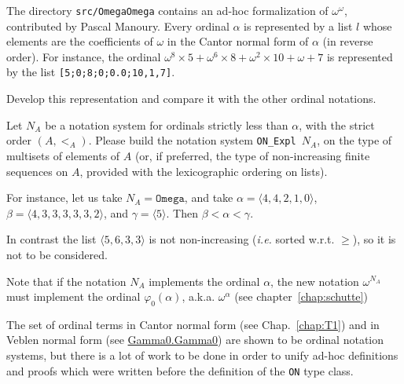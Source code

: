 
\begin{project}
The directory \texttt{src/OmegaOmega} contains an ad-hoc formalization of $\omega^\omega$, contributed by Pascal Manoury. Every ordinal $\alpha$ is represented by a list $l$ whose elements are the coefficients of $\omega$ in  the Cantor normal form of $\alpha$ (in reverse order). For instance, the ordinal 
$\omega^{8}\times 5 + \omega^{6}\times 8 + \omega^2\times 10 + \omega + 7$ is represented by the list \texttt{[5;0;8;0;0.0;10,1,7]}. 


 Develop this representation and compare it with the other ordinal notations.



\end{project}


\begin{project}
Let $N_A$ be a notation system for ordinals strictly less than $\alpha$, 
with the strict order $(A,<_A)$. Please build the notation system
\texttt{ON\_Expl $N_A$}, on the type of multisets of elements of $A$
(or, if preferred, the type of non-increasing finite sequences on $A$,
provided with the lexicographic ordering on lists).

For instance, let us take $N_A=\texttt{Omega}$, and take $\alpha=\langle 4,4,2,1,0\rangle$,
 $\beta=\langle 4,3,3,3,3,3,2\rangle$, and $\gamma=\langle 5\rangle$. Then $\beta<\alpha<\gamma$. 

In contrast the list $\langle5,6,3,3\rangle$ is not non-increasing (\emph{i.e.} sorted w.r.t. $\geq$), so it is not to be considered.

Note that if the notation $N_A$ implements the ordinal 
$\alpha$,  the new notation $\omega^{N_A}$ must implement the ordinal $\varphi_0(\alpha)$, a.k.a. $\omega^\alpha$ (see chapter~\ref{chap:schutte})

\end{project}



\begin{remark}
 The set of ordinal terms in Cantor normal form (see Chap.~\ref{chap:T1}) and 
in Veblen normal form (see 
\href{../src/html/hydras.Gamma0.Gamma0.html}{Gamma0.Gamma0}) are shown to be ordinal notation systems, but there is a lot of work to be done in order to unify ad-hoc  definitions and proofs which were written before the definition of the \texttt{ON} type class.
\end{remark}







